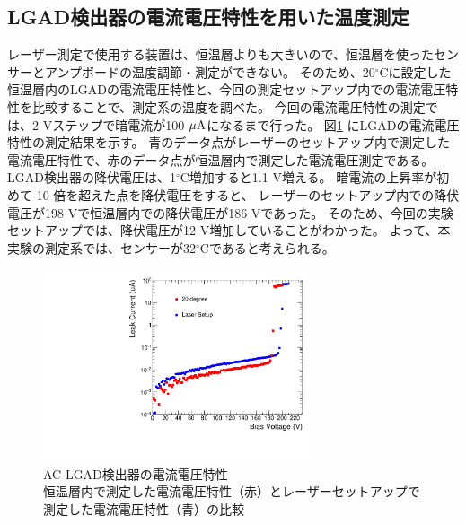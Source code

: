 \subsection{LGAD検出器の電流電圧特性を用いた温度測定}
レーザー測定で使用する装置は、恒温層よりも大きいので、恒温層を使ったセンサーとアンプボードの温度調節・測定ができない。
そのため、20${}^\circ$Cに設定した恒温層内のLGADの電流電圧特性と、今回の測定セットアップ内での電流電圧特性を比較することで、測定系の温度を調べた。
今回の電流電圧特性の測定では、2 Vステップで暗電流が100 $\mu\rm{A}$になるまで行った。
図\ref{fg:IV_temp} にLGADの電流電圧特性の測定結果を示す。
青のデータ点がレーザーのセットアップ内で測定した電流電圧特性で、赤のデータ点が恒温層内で測定した電流電圧測定である。
LGAD検出器の降伏電圧は、1${}^\circ$C増加すると1.1 V増える\cite{Kita_Master}。
暗電流の上昇率が初めて 10 倍を超えた点を降伏電圧をすると、
レーザーのセットアップ内での降伏電圧が198 Vで恒温層内での降伏電圧が186 Vであった。
そのため、今回の実験セットアップでは、降伏電圧が12 V増加していることがわかった。
よって、本実験の測定系では、センサーが32${}^\circ$Cであると考えられる。

\begin{figure}[h]
        \centering
        \includegraphics[width=8cm]{fig/graph/IV_20degree_Lasersetup.pdf}
        \caption[AC-LGAD検出器の電流電圧特性]{AC-LGAD検出器の電流電圧特性\\恒温層内で測定した電流電圧特性（赤）とレーザーセットアップで測定した電流電圧特性（青）の比較}
        \label{fg:IV_temp}
\end{figure}



